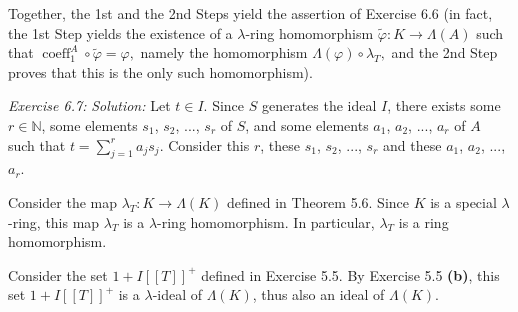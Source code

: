 \documentclass[numbers=enddot,12pt,final,onecolumn,notitlepage]{scrartcl}%
\begin{document}
Together, the 1st and the 2nd Steps yield the assertion of Exercise 6.6 (in
fact, the 1st Step yields the existence of a $\lambda$-ring homomorphism
$\widetilde{\varphi}:K\rightarrow\Lambda\left(  A\right)  $ such that
$\operatorname*{coeff}\nolimits_{1}^{A}\circ\widetilde{\varphi}=\varphi,$
namely the homomorphism $\Lambda\left(  \varphi\right)  \circ\lambda_{T},$ and
the 2nd Step proves that this is the only such homomorphism).

\textit{Exercise 6.7:} \textit{Solution:} Let $t\in I$. Since $S$ generates
the ideal $I$, there exists some $r\in\mathbb{N}$, some elements $s_{1}$,
$s_{2}$, $...$, $s_{r}$ of $S$, and some elements $a_{1}$, $a_{2}$, $...$,
$a_{r}$ of $A$ such that $t=\sum\limits_{j=1}^{r}a_{j}s_{j}$. Consider this
$r$, these $s_{1}$, $s_{2}$, $...$, $s_{r}$ and these $a_{1}$, $a_{2}$, $...$,
$a_{r}$.

Consider the map $\lambda_{T}:K\rightarrow\Lambda\left(  K\right)  $ defined
in Theorem 5.6. Since $K$ is a special $\lambda$-ring, this map $\lambda_{T}$
is a $\lambda$-ring homomorphism. In particular, $\lambda_{T}$ is a ring homomorphism.

Consider the set $1+I\left[  \left[  T\right]  \right]  ^{+}$ defined in
Exercise 5.5. By Exercise 5.5 \textbf{(b)}, this set $1+I\left[  \left[
T\right]  \right]  ^{+}$ is a $\lambda$-ideal of $\Lambda\left(  K\right)  $,
thus also an ideal of $\Lambda\left(  K\right)  $.
\end{document}
